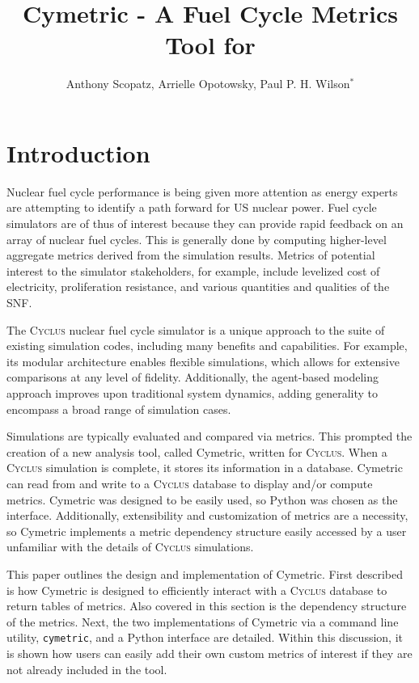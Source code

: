\documentclass{anstrans}
\title{Cymetric - A Fuel Cycle Metrics Tool for \cyclus}
\author{Anthony Scopatz, Arrielle Opotowsky, Paul P. H. Wilson$^{*}$}
\institute{
$^{*}$Department of Engineering Physics, University of Wisconsin - Madison, 
1500 Engineering Drive, Madison WI 53703
}
\newcommand{\cyclus}{\textsc{Cyclus}\xspace}
\newcommand{\code}[1]{{\color{code}\texttt{#1}}}
\begin{document}
\section{Introduction}
Nuclear fuel cycle performance is being given more attention as energy 
experts are attempting to identify a path forward for \gls{US} nuclear power. 
Fuel cycle simulators are of thus of interest because they can provide rapid 
feedback on an array of nuclear fuel cycles. This is generally done by 
computing higher-level aggregate metrics derived from the simulation results. 
Metrics of potential interest to the simulator stakeholders, for example, 
include levelized cost of electricity, proliferation resistance, and various 
quantities and qualities of the \gls{SNF}.

The \cyclus nuclear fuel cycle simulator is a unique approach to the suite of 
existing simulation codes, including many benefits and capabilities.
For example, its modular architecture enables flexible simulations, which 
allows for extensive comparisons at any level of fidelity. Additionally, the 
agent-based modeling approach improves upon traditional system dynamics, adding 
generality to encompass a broad range of simulation cases. \cite{cyclus2015, cyclus_v1.2} 

Simulations are typically evaluated and compared via metrics. This 
prompted the creation of a new analysis tool, called Cymetric, \cite{cymetric} written for 
\cyclus. When a \cyclus simulation is complete, it stores its information in a 
database. Cymetric can read from and write to a \cyclus database to display 
and/or compute metrics. Cymetric was designed to be easily used, so Python was 
chosen as the interface. Additionally, extensibility and customization of metrics
are a necessity, so Cymetric implements a metric dependency structure easily 
accessed by a user unfamiliar with the details of \cyclus simulations.

This paper outlines the design and implementation of Cymetric. First described 
is how Cymetric is designed to efficiently interact with a \cyclus database to 
return tables of metrics. Also covered in this section is the dependency structure of the metrics. 
Next, the two implementations of Cymetric via a command line utility, \code{cymetric},
and a Python interface are detailed.  Within this discussion, it is shown how users can easily 
add their own custom metrics of interest if they are not already included in the
tool. 
\end{document}
